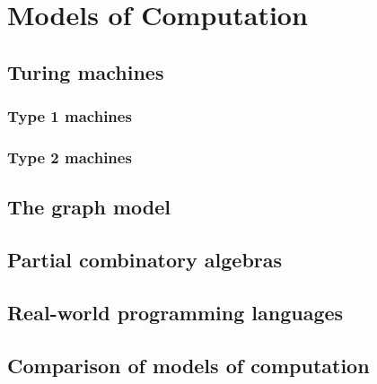 \chapter{Models of Computation\label{cha:models}}


\section{Turing machines}
\label{sec:turing-machines}

\subsection{Type 1 machines}
\label{sec:type-1}


\subsection{Type 2 machines}
\label{sec:type-2}


\section{The graph model}
\label{sec:graph-model}


\section{Partial combinatory algebras}
\label{sec:pcas}


\section{Real-world programming languages}
\label{sec:programming-languages}


\section{Comparison of models of computation}
\label{sec:models-comparison}




